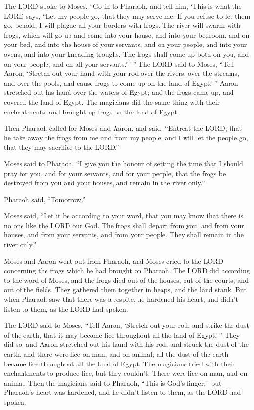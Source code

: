  The LORD spoke to Moses, ``Go in to Pharaoh, and tell him,
`This is what the LORD says, ``Let my people go, that they may serve me.
 If you refuse to let them go, behold, I will plague all
your borders with frogs.  The river will swarm with frogs,
which will go up and come into your house, and into your bedroom, and on
your bed, and into the house of your servants, and on your people, and
into your ovens, and into your kneading troughs.  The frogs
shall come up both on you, and on your people, and on all your
servants.''\,'\,''  The LORD said to Moses, ``Tell Aaron,
`Stretch out your hand with your rod over the rivers, over the streams,
and over the pools, and cause frogs to come up on the land of
Egypt.'\,''  Aaron stretched out his hand over the waters of
Egypt; and the frogs came up, and covered the land of Egypt.
 The magicians did the same thing with their enchantments,
and brought up frogs on the land of Egypt.

 Then Pharaoh called for Moses and Aaron, and said,
``Entreat the LORD, that he take away the frogs from me and from my
people; and I will let the people go, that they may sacrifice to the
LORD.''

 Moses said to Pharaoh, ``I give you the honour of setting
the time that I should pray for you, and for your servants, and for your
people, that the frogs be destroyed from you and your houses, and remain
in the river only.''

 Pharaoh said, ``Tomorrow.''

Moses said, ``Let it be according to your word, that you may know that
there is no one like the LORD our God.  The frogs shall
depart from you, and from your houses, and from your servants, and from
your people. They shall remain in the river only.''

 Moses and Aaron went out from Pharaoh, and Moses cried to
the LORD concerning the frogs which he had brought on Pharaoh.
 The LORD did according to the word of Moses, and the frogs
died out of the houses, out of the courts, and out of the fields.
 They gathered them together in heaps, and the land stank.
 But when Pharaoh saw that there was a respite, he hardened
his heart, and didn't listen to them, as the LORD had spoken.

 The LORD said to Moses, ``Tell Aaron, `Stretch out your
rod, and strike the dust of the earth, that it may become lice
throughout all the land of Egypt.'\,''  They did so; and
Aaron stretched out his hand with his rod, and struck the dust of the
earth, and there were lice on man, and on animal; all the dust of the
earth became lice throughout all the land of Egypt.  The
magicians tried with their enchantments to produce lice, but they
couldn't. There were lice on man, and on animal.  Then the
magicians said to Pharaoh, ``This is God's finger;'' but Pharaoh's heart
was hardened, and he didn't listen to them, as the LORD had spoken.

